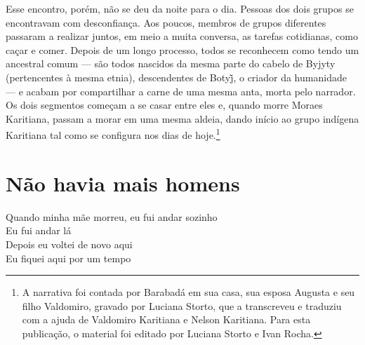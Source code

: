 Esse encontro, porém, não se deu da noite para o dia. Pessoas dos dois grupos se encontravam com desconfiança. Aos poucos, membros de grupos diferentes passaram a realizar juntos, em meio a muita conversa, as tarefas cotidianas, como caçar e comer. Depois de um longo processo, todos se reconhecem como tendo um ancestral comum --- são todos nascidos da mesma parte do cabelo de Byjyty (pertencentes à mesma etnia), descendentes de Botyj̃, o criador da humanidade --- e acabam por compartilhar a carne de uma mesma anta, morta pelo narrador. Os dois segmentos começam a se casar entre eles e, quando morre Moraes Karitiana, passam a morar em uma mesma aldeia, dando início ao grupo indígena Karitiana tal como se configura nos dias de hoje.\footnote{A narrativa foi contada por Barabadá em sua casa, sua esposa Augusta e
seu filho Valdomiro, gravado por Luciana Storto, que a transcreveu e
traduziu com a ajuda de Valdomiro Karitiana e Nelson Karitiana. Para
esta publicação, o material foi editado por Luciana Storto e Ivan Rocha.}

 \chapter{Não havia mais homens}
 

\begin{linenumbers}\begingroup\raggedright
  \noindent Quando minha mãe morreu, eu fui andar sozinho\\
  Eu fui andar lá\\
  Depois eu voltei de novo aqui\\
  Eu fiquei aqui por um tempo
 
\end{linenumbers}\endgroup

\bigskip

